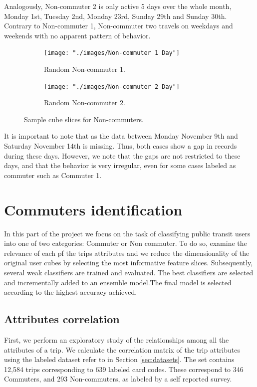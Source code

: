 \documentclass{article}
\begin{document}
Analogously, Non-commuter 2 is only active 5 days over the whole month, Monday 1st, Tuesday 2nd, Monday 23rd, Sunday 29th and Sunday 30th. Contrary to Non-commuter 1, Non-commuter two travels on weekdays and weekends with no apparent pattern of behavior.

\begin{figure}[H]
  \centering
  \begin{subfigure}[b]{.45\textwidth}
  	\centering
	\texttt{[image: "./images/Non-commuter 1 Day"]}
  	\caption{Random Non-commuter 1.}
  \end{subfigure}
  \begin{subfigure}[b]{.45\textwidth}
  	\centering
	\texttt{[image: "./images/Non-commuter 2 Day"]}
  	\caption{Random Non-commuter 2.}
  \end{subfigure}
  \caption{Sample cube slices for Non-commuters.}
  	\label{fig:preprocessing/cubesNonCom} 
\end{figure}

It is important to note that as the data between Monday November 9th and Saturday November 14th is missing. Thus, both cases show a gap in records during these days. However, we note that the gaps are not restricted to these days, and that the behavior is very irregular, even for some cases labeled as commuter such as Commuter 1. 

\newpage
\section{Commuters identification}
\label{sec:partII}
In this part of the project we focus on the task of classifying public transit users into one of two categories: Commuter or Non commuter. To do so, examine the relevance of each pf the trips attributes and we reduce the dimensionality of the original user cubes by selecting the most informative feature slices. Subsequently, several weak classifiers are trained and evaluated. The best classifiers are selected and incrementally added to an ensemble model.The final model is selected according to the highest accuracy achieved.

\subsection{Attributes correlation} 
First, we perform an exploratory study of the relationships among all the attributes of a trip. We calculate the correlation matrix of the trip attributes using the labeled dataset refer to in Section \ref{sec:datasets}. The set contains 12,584 trips corresponding to 639 labeled card codes. These correspond to 346 Commuters, and 293 Non-commuters, as labeled by a self reported survey. 
\end{document}
